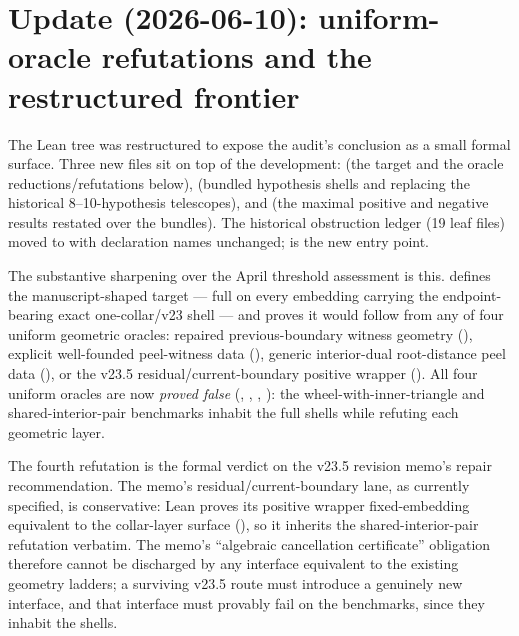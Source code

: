 \documentclass[11pt]{article}
\begin{document}
\section{Update (2026-06-10): uniform-oracle refutations and the restructured frontier}

The Lean tree was restructured to expose the audit's conclusion as a small
formal surface.  Three new files sit on top of the development:
 (the target and the oracle reductions/refutations below),
 (bundled hypothesis shells  and
 replacing the historical 8--10-hypothesis
telescopes), and  (the maximal positive and negative
results restated over the bundles).  The historical obstruction ledger (19
leaf files) moved to  with
declaration names unchanged;  is the new entry point.

The substantive sharpening over the April threshold assessment is this.
 defines the manuscript-shaped target
 --- full  on
every embedding carrying the endpoint-bearing exact one-collar/v23 shell ---
and proves it would follow from any of four uniform geometric oracles:
repaired previous-boundary witness geometry
(), explicit well-founded peel-witness
data (), generic interior-dual root-distance peel
data (), or the v23.5 residual/current-boundary
positive wrapper ().  All four uniform
oracles are now \emph{proved false}
(,
, ,
): the wheel-with-inner-triangle and
shared-interior-pair benchmarks inhabit the full shells while refuting each
geometric layer.

The fourth refutation is the formal verdict on the v23.5 revision memo's
repair recommendation.  The memo's residual/current-boundary lane, as
currently specified, is conservative: Lean proves its positive wrapper
fixed-embedding equivalent to the collar-layer surface
(),
so it inherits the shared-interior-pair refutation verbatim.  The memo's
``algebraic cancellation certificate'' obligation therefore cannot be
discharged by any interface equivalent to the existing geometry ladders; a
surviving v23.5 route must introduce a genuinely new interface, and that
interface must provably fail on the benchmarks, since they inhabit the shells.
\end{document}
